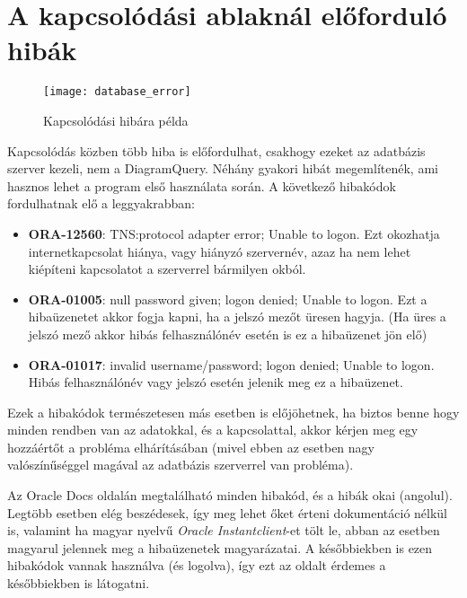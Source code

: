 \section{A kapcsolódási ablaknál előforduló hibák}

\begin{figure}[ht]
  \begin{center}
  \texttt{[image: database\_error]}
  \end{center}
 \caption{Kapcsolódási hibára példa}
\end{figure}

Kapcsolódás közben több hiba is előfordulhat, csakhogy ezeket az adatbázis szerver kezeli, nem a DiagramQuery.
Néhány gyakori hibát megemlítenék, ami hasznos lehet
a program első használata során. A következő hibakódok fordulhatnak elő a leggyakrabban:
\begin{itemize}
  \item \textbf{ORA-12560}: TNS:protocol adapter error; Unable to logon. Ezt okozhatja internetkapcsolat hiánya,
  vagy hiányzó szervernév, azaz ha nem lehet kiépíteni kapcsolatot a szerverrel bármilyen okból.
  \item \textbf{ORA-01005}: null password given; logon denied; Unable to logon. Ezt a hibaüzenetet akkor fogja kapni,
  ha a jelszó mezőt üresen hagyja. (Ha üres a jelszó mező akkor hibás felhasználónév esetén is ez a hibaüzenet jön elő)
  \item \textbf{ORA-01017}: invalid username/password; logon denied; Unable to logon. Hibás felhasználónév vagy jelszó 
  esetén jelenik meg ez a hibaüzenet.
\end{itemize}

Ezek a hibakódok természetesen más esetben is előjöhetnek, ha biztos benne hogy minden rendben van az adatokkal, és a
kapcsolattal, akkor kérjen meg egy hozzáértőt a probléma elhárításában (mivel ebben az esetben nagy valószínűséggel
magával az adatbázis szerverrel van probléma).

Az Oracle Docs\cite{oracledocs} oldalán megtalálható minden hibakód, és a hibák okai (angolul).
Legtöbb esetben elég beszédesek, így meg lehet őket érteni dokumentáció nélkül is, valamint ha magyar nyelvű
\textit{Oracle Instantclient}-et tölt le, abban az esetben magyarul jelennek meg a hibaüzenetek magyarázatai.
A későbbiekben is ezen hibakódok vannak használva (és logolva), így ezt az oldalt érdemes a későbbiekben is látogatni.

